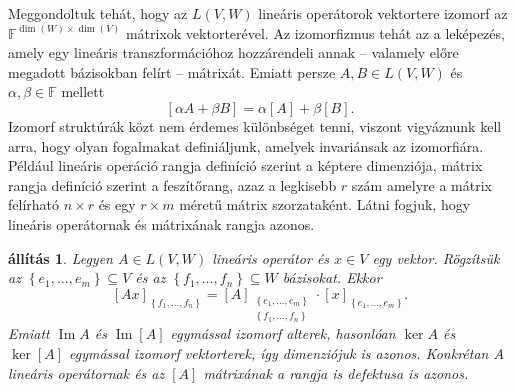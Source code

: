 \documentclass[9pt, a4paper, showtrims]{memoir}
\theoremstyle{plain}
\newtheorem{proposition}{állítás}[chapter]
\theoremstyle{remark}
\theoremstyle{definition}
\DeclareMathOperator{\im}{Im}
\begin{document}
Meggondoltuk tehát, hogy az $L\left( V,W \right)$ lineáris operátorok vektortere izomorf az
$\mathbb{F}^{\dim(W)\times \dim(V)}$ mátrixok vektorterével.
Az izomorfizmus tehát az a leképezés,
amely egy lineáris transzformációhoz hozzárendeli annak
-- valamely előre megadott bázisokban felírt --
mátrixát.
Emiatt persze $A,B\in L\left( V,W \right)$ és $\alpha,\beta\in\mathbb{F}$ mellett
\begin{equation}\label{eq:vt}
	\left[ \alpha A+\beta B \right]=\alpha\left[ A \right]+\beta\left[ B \right].
\end{equation}
Izomorf struktúrák közt nem érdemes különbséget tenni, viszont vigyáznunk kell arra,
hogy olyan fogalmakat definiáljunk, amelyek invariánsak az izomorfiára.
Például lineáris operáció rangja definíció szerint a képtere dimenziója,
mátrix rangja definíció szerint a feszítőrang, azaz a legkisebb
$r$ szám amelyre a mátrix felírható $n\times r$ és egy $r\times m$ méretű mátrix szorzataként.
Látni fogjuk, hogy lineáris operátornak és mátrixának rangja azonos.
\begin{proposition}
	Legyen $A\in L\left( V,W \right)$ lineáris operátor és $x\in V$ egy vektor.
	Rögzítsük az $\left\{ e_1,\ldots,e_m \right\}\subseteq V$ és az $\left\{ f_1,\ldots,f_n \right\}\subseteq W$ bázisokat.
	Ekkor
	\[
		[Ax]_{\left\{ f_1,\ldots,f_n \right\}}
		=
		[A]_{\substack{\left\{ e_1,\ldots,e_m \right\}\\ \left\{ f_1,\ldots,f_n \right\}}}
		\cdot
		[x]_{\left\{ e_1,\ldots,e_m \right\}}.
	\]
	Emiatt $\im A$ és $\im[A]$ egymással izomorf alterek, hasonlóan $\ker A$ és $\ker[A]$ egymással
	izomorf vektorterek, így dimenziójuk is azonos.
	Konkrétan $A$ lineáris operátornak és az $[A]$ mátrixának a rangja is defektusa is azonos.
\end{proposition}
\end{document}
